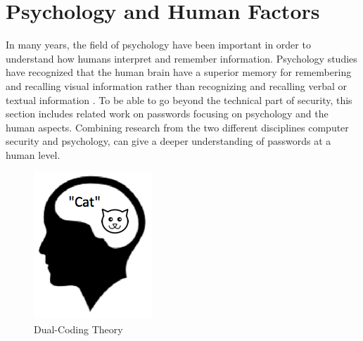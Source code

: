 \section{Psychology and Human Factors}\label{sec:humanfactors}

	In many years, the field of psychology have been important in order to understand how humans interpret and remember information. Psychology studies have recognized that the human brain have a superior memory for remembering and recalling visual information rather than recognizing and recalling verbal or textual information \cite{DeAngeli}. To be able to go beyond the technical part of security, this section includes related work on passwords focusing on psychology and the human aspects. Combining research from the two different disciplines computer security and psychology, can give a deeper understanding of passwords at a human level.

		\begin{figure}
      \vspace{-10pt}
      \begin{center}
        \includegraphics[scale=0.5]{pics/review/dualCoding.png}
      \end{center}
      \vspace{-10pt}
      \caption{Dual-Coding Theory}
      \vspace{-10pt}
      \label{fig:dualcoding}
    \end{figure}

